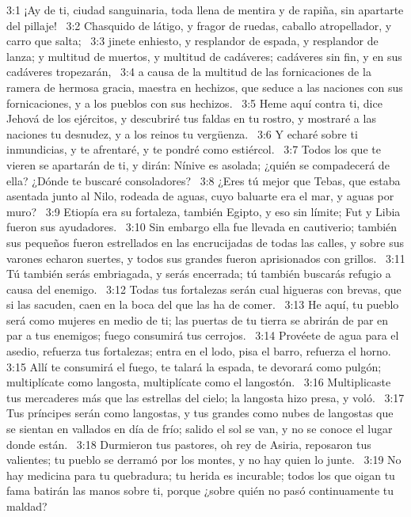 3:1 ¡Ay de ti, ciudad sanguinaria, toda llena de mentira y de rapiña, sin apartarte del pillaje!  
3:2 Chasquido de látigo, y fragor de ruedas, caballo atropellador, y carro que salta;  
3:3 jinete enhiesto, y resplandor de espada, y resplandor de lanza; y multitud de muertos, y multitud de cadáveres; cadáveres sin fin, y en sus cadáveres tropezarán,  
3:4 a causa de la multitud de las fornicaciones de la ramera de hermosa gracia, maestra en hechizos, que seduce a las naciones con sus fornicaciones, y a los pueblos con sus hechizos.  
3:5 Heme aquí contra ti, dice Jehová de los ejércitos, y descubriré tus faldas en tu rostro, y mostraré a las naciones tu desnudez, y a los reinos tu vergüenza.  
3:6 Y echaré sobre ti inmundicias, y te afrentaré, y te pondré como estiércol.  
3:7 Todos los que te vieren se apartarán de ti, y dirán: Nínive es asolada; ¿quién se compadecerá de ella? ¿Dónde te buscaré consoladores?  
3:8 ¿Eres tú mejor que Tebas, que estaba asentada junto al Nilo, rodeada de aguas, cuyo baluarte era el mar, y aguas por muro?  
3:9 Etiopía era su fortaleza, también Egipto, y eso sin límite; Fut y Libia fueron sus ayudadores.  
3:10 Sin embargo ella fue llevada en cautiverio; también sus pequeños fueron estrellados en las encrucijadas de todas las calles, y sobre sus varones echaron suertes, y todos sus grandes fueron aprisionados con grillos.  
3:11 Tú también serás embriagada, y serás encerrada; tú también buscarás refugio a causa del enemigo.  
3:12 Todas tus fortalezas serán cual higueras con brevas, que si las sacuden, caen en la boca del que las ha de comer.  
3:13 He aquí, tu pueblo será como mujeres en medio de ti; las puertas de tu tierra se abrirán de par en par a tus enemigos; fuego consumirá tus cerrojos.  
3:14 Provéete de agua para el asedio, refuerza tus fortalezas; entra en el lodo, pisa el barro, refuerza el horno.  
3:15 Allí te consumirá el fuego, te talará la espada, te devorará como pulgón; multiplícate como langosta, multiplícate como el langostón.  
3:16 Multiplicaste tus mercaderes más que las estrellas del cielo; la langosta hizo presa, y voló.  
3:17 Tus príncipes serán como langostas, y tus grandes como nubes de langostas que se sientan en vallados en día de frío; salido el sol se van, y no se conoce el lugar donde están.  
3:18 Durmieron tus pastores, oh rey de Asiria, reposaron tus valientes; tu pueblo se derramó por los montes, y no hay quien lo junte.  
3:19 No hay medicina para tu quebradura; tu herida es incurable; todos los que oigan tu fama batirán las manos sobre ti, porque ¿sobre quién no pasó continuamente tu maldad?